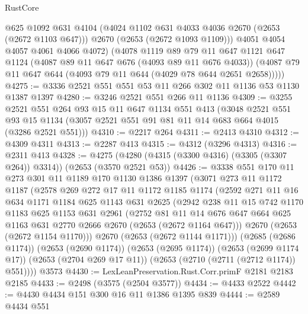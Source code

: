 \begin{lexlean}{RustCore}
\begin{coremodule}
          @625
          @1092
          @631
          @4104
          (@4024 @1102 @631 @4033 @4036 @2670 (@2653 (@2672 @1103 @647)))
          @2670
          (@2653 (@2672 @1093 @1109)))
        @4051
        @4054
        @4057
        @4061
        @4066
        @4072)
      (@4078
        @1119
        @89
        @79
        @11
        @647
        @1121
        @647
        @1124
        (@4087 @89 @11 @647 @676 (@4093 @89 @11 @676 @4033))
        (@4087 @79 @11 @647 @644 (@4093 @79 @11 @644 (@4029 @78 @644 @2651 @2658)))))
@4275 := @3336 @2521 @551 @551 @53 @11 @266 @302 @11 @1136 @53 @1130 @1387 @1397
@4280 := @3246 @2521 @551 @266 @11 @1136
@4309 := @3255
    @2521
    @551
    @264
    @93
    @15
    @11
    @647
    @1134
    @551
    @413
    (@3048
      @2521
      @551
      @93
      @15
      @1134
      (@3057 @2521 @551 @91 @81 @11 @14 @683 @664 @4015 (@3286 @2521 @551)))
@4310 := @2217 @264
@4311 := @2413 @4310
@4312 := @4309 @4311
@4313 := @2287 @413
@4315 := @4312 (@3296 @4313)
@4316 := @2311 @413
@4328 := @4275 (@4280 (@4315 (@3300 @4316) (@3305 (@3307 @264)) @3314)) (@2653 (@3570 @2521 @53))
@4426 := @3338
    @551
    @170
    @11
    @273
    @301
    @11
    @1189
    @170
    @1130
    @1386
    @1397
    (@3071
      @273
      @11
      @1172
      @1187
      (@2578
        @269
        @272
        @17
        @11
        @1172
        @1185
        @1174
        (@2592
          @271
          @11
          @16
          @634
          @1171
          @1184
          @625
          @1143
          @631
          @2625
          (@2942
            @238
            @11
            @15
            @742
            @1170
            @1183
            @625
            @1153
            @631
            @2961
            (@2752
              @81
              @11
              @14
              @676
              @647
              @664
              @625
              @1163
              @631
              @2770
              @2666
              @2670
              (@2653 (@2672 @1164 @647)))
            @2670
            (@2653 (@2672 @1154 @1170)))
          @2670
          (@2653 (@2672 @1144 @1171)))
        (@2685 (@2686 @1174))
        (@2653 (@2690 @1174))
        (@2653 (@2695 @1174))
        (@2653 (@2699 @1174 @17))
        (@2653 (@2704 @269 @17 @11))
        (@2653 (@2710 (@2711 (@2712 @1174)) @551))))
    @3573
@4430 := LexLeanPreservation.Rust.Corr.primF @2181 @2183 @2185
@4433 := @2498 (@3575 (@2504 @3577))
@4434 := @4433 @2522
@4442 := @4430 @4434 @151 @300 @16 @11 @1386 @1395 @839
@4444 := @2589 @4434 @551

\end{coremodule}
\end{lexlean}
